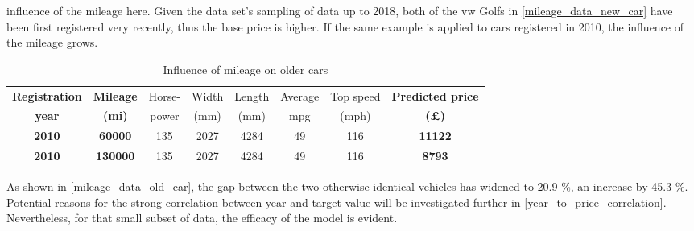 influence of the mileage here.
Given the data set's sampling of data up to 2018, both of the \ac{vw} Golfs in \autoref{mileage_data_new_car} have been first registered very recently,
thus the base price is higher.
If the same example is applied to cars registered in 2010, the influence of the mileage grows.
\begin{table}[H]
    \begin{adjustbox}{width={\textwidth}}
        \begin{tabular}{|c|c|c|c|c|c|c|c|}
            \hline
            \textbf{Registration} & \textbf{Mileage} & Horse- & Width & Length & Average & Top speed & \textbf{Predicted price} \\[-1ex]
            \textbf{year}         & \textbf{(mi)}    & power  & (mm)  & (mm)   & mpg     & (mph)     & \textbf{(£)}             \\ \hline
            \textbf{2010}         & \textbf{60000}   & 135    & 2027  & 4284   & 49      & 116       & \textbf{11122}           \\\hline
            \textbf{2010}         & \textbf{130000}  & 135    & 2027  & 4284   & 49      & 116       & \textbf{8793}            \\\hline
        \end{tabular}
    \end{adjustbox}
    \caption{Influence of mileage on older cars}
    \label{mileage_data_old_car}
\end{table}
As shown in \autoref{mileage_data_old_car}, the gap between the two otherwise identical vehicles has widened to 20.9 \%, an increase by 45.3 \%.
Potential reasons for the strong correlation between year and target value will be investigated further in \autoref{year_to_price_correlation}.
Nevertheless, for that small subset of data, the efficacy of the model is evident.
